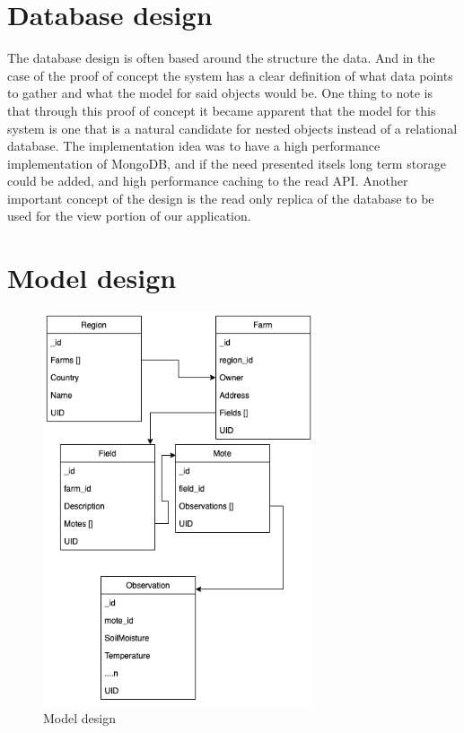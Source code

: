 \documentclass[]{uiophd}
\begin{document}
\section{Database design}
The database design is often based around the structure the data. And in the case of the proof of concept the system has a clear definition of what data points to gather and what the model for said objects would be. One thing to note is that through this proof of concept it became apparent that the model for this system is one that is a natural candidate for nested objects instead of a relational database. The implementation idea was to have a high performance implementation of MongoDB, and if the need presented itsels long term storage could be added, and high performance caching to the read API. Another important concept of the design is the read only replica of the database to be used for the view portion of our application.
\section{Model design}
\begin{figure}[h]
\caption{Model design}
\centering
\includegraphics[width=8cm]{model_golden.png}
\end{figure}
\end{document}
